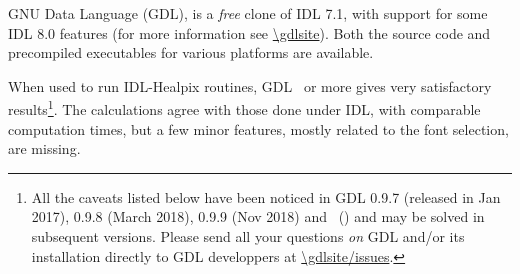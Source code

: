 \documentclass[12pt,twoside]{article}
\begin{document}
GNU Data Language (GDL), is a {\em free} clone of IDL 7.1, with support for some IDL 8.0 features (for more information see
\url{\gdlsite}).
Both the source code and precompiled executables for various platforms are available.

When used to run IDL-Healpix routines, GDL \gdlversion\ or more gives
very satisfactory results\footnote{All the caveats listed below have been noticed in
GDL 0.9.7 (released in Jan 2017), 
0.9.8 (March 2018),
0.9.9 (Nov 2018) and 
\gdlversion\ (\gdlreldate) and may be solved in subsequent versions. Please send all your questions
{\em on} GDL and/or its installation directly to GDL developpers at 
\url{\gdlsite/issues}.}. 
The calculations agree with those done under IDL, with
comparable computation times, but a few minor features, mostly related to the font selection, are missing.
\end{document}
